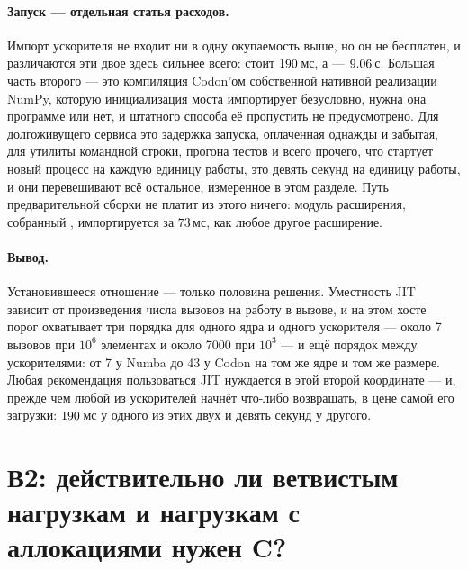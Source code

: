 \paragraph{Запуск --- отдельная статья расходов.} Импорт ускорителя не входит ни в одну
окупаемость выше, но он не бесплатен, и различаются эти двое здесь сильнее всего:
 стоит $\meas{fact:b1_breakeven-314:facts.numba_import_s:ms}{190}$\,мс, а  --- $\meas{fact:b1_breakeven-314:facts.codon_cost_s.import_s}{9.06}$\,с. Большая часть
второго --- это компиляция Codon'ом собственной нативной реализации NumPy, которую инициализация
моста импортирует безусловно, нужна она программе или нет, и штатного способа её пропустить не
предусмотрено. Для долгоживущего сервиса это задержка запуска, оплаченная однажды и забытая, для
утилиты командной строки, прогона тестов и всего прочего, что стартует новый процесс на каждую
единицу работы, это девять секунд на единицу работы, и они перевешивают всё остальное,
измеренное в этом разделе. Путь предварительной сборки не платит из этого ничего: модуль
расширения, собранный , импортируется за $73$\,мс, как любое другое
расширение.

\paragraph{Вывод.} Установившееся отношение --- только половина решения. Уместность JIT зависит от
произведения числа вызовов на работу в вызове, и на этом хосте порог охватывает три порядка для
одного ядра и одного ускорителя --- около 7 вызовов при $10^6$ элементах и около 7000 при $10^3$
--- и ещё порядок между ускорителями: от 7 у Numba до 43 у Codon на том же ядре и том же размере.
Любая рекомендация пользоваться JIT нуждается в этой второй координате --- и, прежде чем любой из
ускорителей начнёт что-либо возвращать, в цене самой его загрузки: $\meas{fact:b1_breakeven-314:facts.numba_import_s:ms}{190}$\,мс у одного из этих
двух и девять секунд у другого.

\section{В2: действительно ли ветвистым нагрузкам и нагрузкам с аллокациями нужен C?}
\label{sec:rq2}


